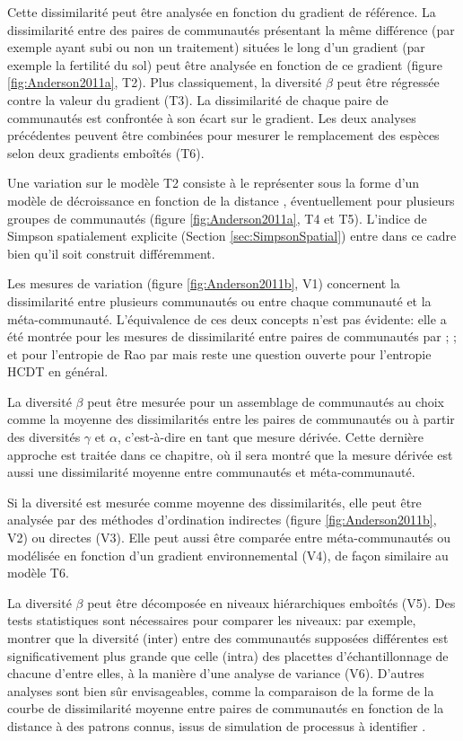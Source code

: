 \documentclass[
  11pt,
  french,
  a4paper,
  extrafontsizes,onecolumn,openright
  ]{memoir}
\begin{document}
Cette dissimilarité peut être analysée en fonction du gradient de référence.
La dissimilarité entre des paires de communautés présentant la même différence (par exemple ayant subi ou non un traitement) situées le long d'un gradient (par exemple la fertilité du sol) peut être analysée en fonction de ce gradient (figure \ref{fig:Anderson2011a}, T2).
Plus classiquement, la diversité \(\beta\) peut être régressée contre la valeur du gradient (T3).
La dissimilarité de chaque paire de communautés est confrontée à son écart sur le gradient.
Les deux analyses précédentes peuvent être combinées pour mesurer le remplacement des espèces selon deux gradients emboîtés (T6).

Une variation sur le modèle T2 consiste à le représenter sous la forme d'un modèle de décroissance en fonction de la distance \autocite{Nekola1999}, éventuellement pour plusieurs groupes de communautés (figure \ref{fig:Anderson2011a}, T4 et T5).
L'indice de Simpson spatialement explicite (Section \ref{sec:SimpsonSpatial}) entre dans ce cadre bien qu'il soit construit différemment.

Les mesures de variation (figure \ref{fig:Anderson2011b}, V1) concernent la dissimilarité entre plusieurs communautés ou entre chaque communauté et la méta-communauté.
L'équivalence de ces deux concepts n'est pas évidente: elle a été montrée pour les mesures de dissimilarité entre paires de communautés par \textcite{Legendre1999}; \textcite{Legendre2001}; \textcite{Legendre2005} et pour l'entropie de Rao par \textcite{Pavoine2004} mais reste une question ouverte pour l'entropie HCDT en général.

La diversité \(\beta\) peut être mesurée pour un assemblage de communautés au choix comme la moyenne des dissimilarités entre les paires de communautés ou à partir des diversités \(\gamma\) et \(\alpha\), c'est-à-dire en tant que mesure dérivée.
Cette dernière approche est traitée dans ce chapitre, où il sera montré que la mesure dérivée est aussi une dissimilarité moyenne entre communautés et méta-communauté.

Si la diversité est mesurée comme moyenne des dissimilarités, elle peut être analysée par des méthodes d'ordination indirectes (figure \ref{fig:Anderson2011b}, V2) ou directes (V3). Elle peut aussi être comparée entre méta-communautés ou modélisée en fonction d'un gradient environnemental (V4), de façon similaire au modèle T6.

La diversité \(\beta\) peut être décomposée en niveaux hiérarchiques emboîtés (V5). Des tests statistiques sont nécessaires pour comparer les niveaux: par exemple, montrer que la diversité (inter) entre des communautés supposées différentes est significativement plus grande que celle (intra) des placettes d'échantillonnage de chacune d'entre elles, à la manière d'une analyse de variance (V6).
D'autres analyses sont bien sûr envisageables, comme la comparaison de la forme de la courbe de dissimilarité moyenne entre paires de communautés en fonction de la distance à des patrons connus, issus de simulation de processus à identifier \autocite{Rejou-Mechain2011}.
\end{document}
